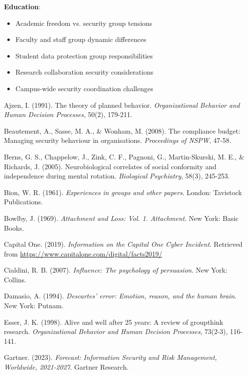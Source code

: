 \documentclass[11pt,a4paper]{article}
\begin{document}
\textbf{Education}:
\begin{itemize}
\item Academic freedom vs. security group tensions
\item Faculty and staff group dynamic differences
\item Student data protection group responsibilities
\item Research collaboration security considerations
\item Campus-wide security coordination challenges
\end{itemize}

\begin{thebibliography}{99}

Ajzen, I. (1991). The theory of planned behavior. \textit{Organizational Behavior and Human Decision Processes}, 50(2), 179-211.

Beautement, A., Sasse, M. A., \& Wonham, M. (2008). The compliance budget: Managing security behaviour in organisations. \textit{Proceedings of NSPW}, 47-58.

Berns, G. S., Chappelow, J., Zink, C. F., Pagnoni, G., Martin-Skurski, M. E., \& Richards, J. (2005). Neurobiological correlates of social conformity and independence during mental rotation. \textit{Biological Psychiatry}, 58(3), 245-253.

Bion, W. R. (1961). \textit{Experiences in groups and other papers}. London: Tavistock Publications.

Bowlby, J. (1969). \textit{Attachment and Loss: Vol. 1. Attachment}. New York: Basic Books.

Capital One. (2019). \textit{Information on the Capital One Cyber Incident}. Retrieved from \url{https://www.capitalone.com/digital/facts2019/}

Cialdini, R. B. (2007). \textit{Influence: The psychology of persuasion}. New York: Collins.

Damasio, A. (1994). \textit{Descartes' error: Emotion, reason, and the human brain}. New York: Putnam.

Esser, J. K. (1998). Alive and well after 25 years: A review of groupthink research. \textit{Organizational Behavior and Human Decision Processes}, 73(2-3), 116-141.

Gartner. (2023). \textit{Forecast: Information Security and Risk Management, Worldwide, 2021-2027}. Gartner Research.


\end{thebibliography}
\end{document}
